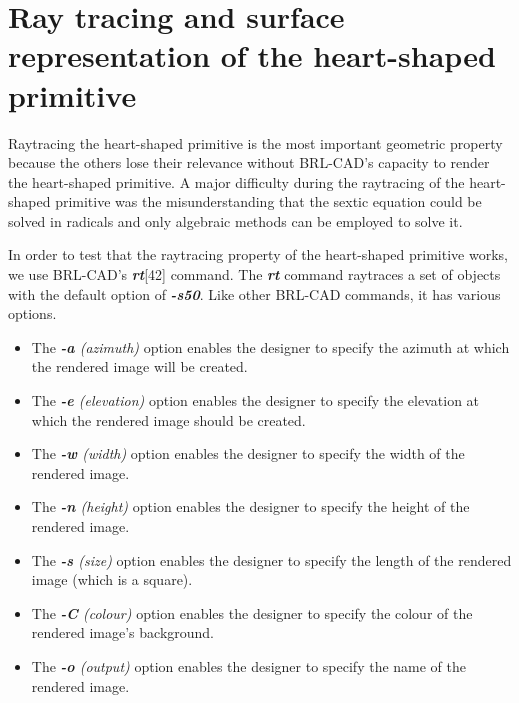 

\section{Ray tracing and surface representation of the heart-­shaped primitive}

\hspace{30} Ray­tracing   the   heart­-shaped   primitive   is   the   most   important   geometric  
property   because   the   others   lose their relevance without   BRL­-CAD's   capacity   to   render  
the   heart­-shaped   primitive.   A   major   difficulty   during   the   raytracing   of   the  
heart­-shaped   primitive   was   the   misunderstanding   that   the   sextic   equation   could  
be solved in radicals and only algebraic methods can be employed to solve it.  

\hspace{30} In   order   to   test   that   the   ray­tracing   property   of   the   heart­-shaped   primitive  
works, we use BRL-­CAD's \textit{\textbf{rt}}[42] command. The \textit{\textbf{rt}} command ray­traces a set
 of objects with the default option of \textit{\textbf{-­s50}}. Like other BRL­-CAD commands, it has various options.

\begin{itemize}
\item The \textit{\textbf{-a} (azimuth)} option enables the designer to specify the azimuth at which the rendered image will be created.  
\item The \textit{\textbf{-­e} (elevation)} option enables the designer to specify the elevation at which the rendered image should be created.  
\item The \textit{\textbf{-w} (width)} option enables the designer to specify the width of the rendered image.  
\item The \textit{\textbf{-­n} (height)} option enables the designer to specify the height of the rendered image.  
\item The \textit{\textbf{-­s} (size)} option enables the designer to specify the length of the rendered image (which is a square).  
\item The \textit{\textbf{-­C} (colour)} option enables the designer to specify the colour of the rendered image's background.  
\item The \textit{\textbf{-­o} (output)} option enables the designer to specify the name of the rendered image.
\end{itemize}

